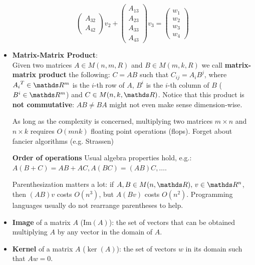 \documentclass[computationalMathematics.tex]{subfiles}
\begin{document}
\begin{itemize}
\[\begin{pmatrix}
                A_{32}\\
                A_{42}
        \end{pmatrix}v_2 + 
        \begin{pmatrix}
                A_{13}\\
                A_{23}\\
                A_{33}\\
                A_{43}
        \end{pmatrix}v_3 =
        \begin{pmatrix}
                  w_1\\
                  w_2\\
                  w_3\\
                  w_4
        \end{pmatrix}
      \]
  \item \textbf{Matrix-Matrix Product}:\\
        Given two matrices $A \in M(n, m, R)$ and $B \in M(m, k, R)$ we call \textbf{matrix-matrix product} the following:
        $C=AB$ such that $C_{ij} = A_i B^j$, where $\tr{A_i} \in \R^m$ is the $i$-th row of $A$, $B^i$ is the $i$-th column of $B$ ($B^i \in \R^m$) and $C \in M(n, k, \R)$. Notice that this product is \textbf{not commutative}: $AB \neq BA$ might not even make sense dimension-wise.
        
As long as the complexity is concerned, multiplying two matrices $m \times n$ and $n \times k$ requires $O(m n k)$ floating point operations (flops). Forget about fancier algorithms (e.g. Strassen)
        
\begin{myframe}{\bf Order of operations}
  Usual algebra properties hold, e.g.: $A(B + C) = AB + AC, A(BC) = (AB)C, \ldots$.
  
  Parenthesization matters a lot: if $A, B \in M(n, \R), \, v \in \R^n$, then $(AB)v$ costs $O(n^3)$, but $A(Bv)$ costs $O(n^2)$.
  Programming languages usually do not rearrange parentheses to help.
\end{myframe}

     \item \textbf{Image} of a matrix $A$ ($\text{Im}(A)$):  the set of vectors that can    be obtained multiplying $A$ by any vector in the domain of $A$.

     \item \textbf{Kernel} of a matrix $A$ ($\ker(A)$):  the set of vectors $w$ in its domain such that $Aw=0$.


\end{itemize}
\end{document}
